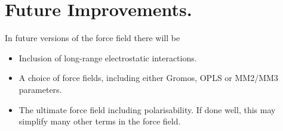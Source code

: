 \section{Future Improvements.}
{\undercons}
In future versions of the force field there will be
\begin{itemize}
\item  	Inclusion of long-range electrostatic interactions.
\item	A choice of force fields, including either Gromos, OPLS or
        MM2/MM3 parameters. 
\item	The ultimate force field including polarisability. If done
        well, this may simplify many other terms in the force field. 
\end{itemize}
